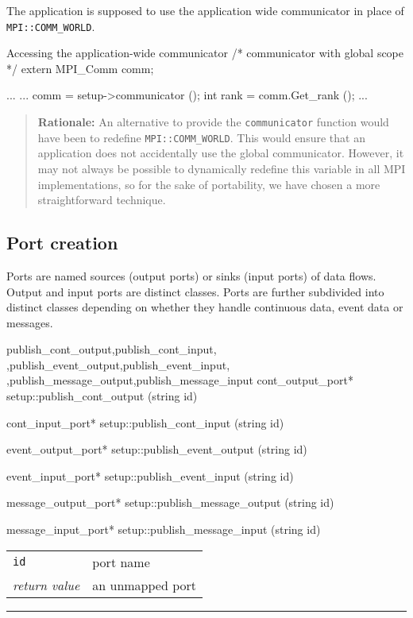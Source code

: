 \documentclass[a4paper,twoside]{report}
\makeatletter
\newenvironment{rationale}%
{\par\begin{quote}\textbf{Rationale:}}%
{\par\end{quote}}
\newenvironment{parameters}%
{\begin{tabular}{@{\hspace{2em}}lp{0.6\textwidth}}}%
{\end{tabular}\par\vspace{1mm}\par\hrule\par\vspace{5mm}}
\makeatother
\begin{document}
The application is supposed to use the application wide communicator
in place of
\lstinline|MPI::COMM_WORLD|.

\begin{code}{Accessing the application-wide communicator}
/* communicator with global scope */
extern MPI_Comm comm;

...
{
  ...
  comm = setup->communicator ();
  int rank = comm.Get_rank ();
  ...
}
\end{code}

\begin{rationale}
  An alternative to provide the \lstinline|communicator| function
  would have been to redefine \lstinline|MPI::COMM_WORLD|.  This would
  ensure that an application does not accidentally use the global
  communicator.  However, it may not always be possible to dynamically
  redefine this variable in all MPI implementations, so for the sake
  of portability, we have chosen a more straightforward technique.
\end{rationale}


\subsection{Port creation}

Ports are named sources (output ports) or sinks (input
ports) of data flows.  Output and input ports are distinct classes.
Ports are further subdivided into distinct classes depending on
whether they handle continuous data, event data or messages.

\begin{head}{publish_cont_output,publish_cont_input,
            ,publish_event_output,publish_event_input,
            ,publish_message_output,publish_message_input}
  cont_output_port* setup::publish_cont_output (string id)

  cont_input_port* setup::publish_cont_input (string id)

  event_output_port* setup::publish_event_output (string id)

  event_input_port* setup::publish_event_input (string id)

  message_output_port* setup::publish_message_output (string id)

  message_input_port* setup::publish_message_input (string id)
\end{head}
\begin{parameters}
  \lstinline|id| & port name \\
  \emph{return value} & an unmapped port \\
\end{parameters}
\end{document}
